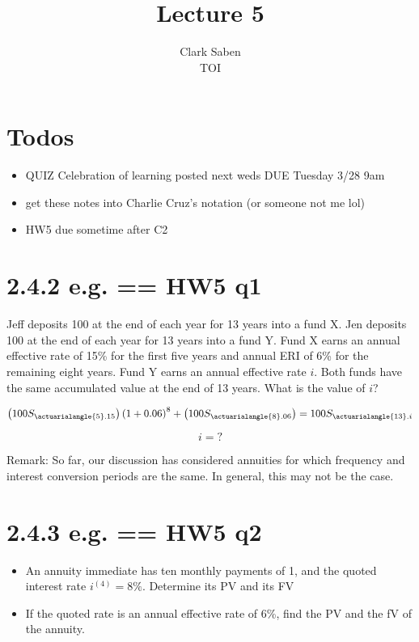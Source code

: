 \documentclass[12pt]{article}
\begin{document}
 
 
\title{Lecture 5}%
\author{Clark Saben\\ %
TOI} %
 
\maketitle

\section{Todos}

\begin{itemize}
	\item QUIZ Celebration of learning posted next weds DUE Tuesday 3/28 9am
	\item get these notes into Charlie Cruz's notation (or someone not me lol)
	\item HW5 due sometime after C2
\end{itemize}

\section{2.4.2 e.g. == HW5 q1}
Jeff deposits 100 at the end of each year for 13 years into a fund X. 
Jen deposits 100 at the end of each year for 13 years into a fund Y. 
Fund X earns an annual effective rate of 15\% for the first five years and 
annual ERI of 6\% for the remaining eight years. Fund Y earns an annual 
effective rate $i$. Both funds have the same accumulated value at the end of 13
years. What is the value of $i$?

$$
\left(100S_{\actuarialangle{5}.15}\right)\left(1+0.06\right)^8 + \left(100S_{\actuarialangle{8}.06}\right)= 100S_{\actuarialangle{13}.i}
$$

$$
i=?
$$

Remark: So far, our discussion has considered annuities for which frequency and interest conversion periods
are the same. In general, this may not be the case.

\section{2.4.3  e.g. == HW5 q2}
\begin{itemize}
	\item An annuity immediate has ten monthly payments of 1, and the quoted interest rate $i^{(4)}=8\%$. Determine its PV and its FV\\
	\item If the quoted rate is an annual effective rate of 6\%, find the PV and the fV of the annuity.
\end{itemize}
\end{document}
